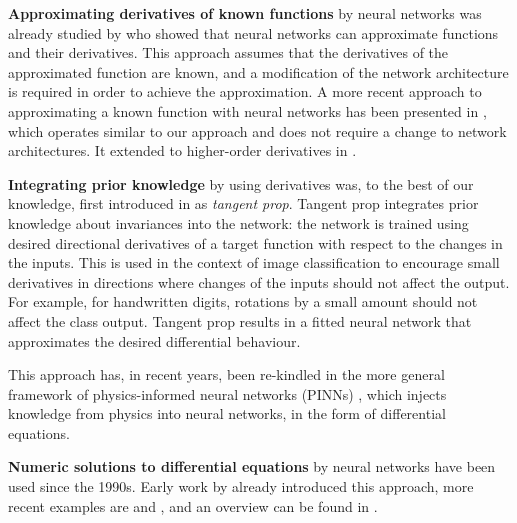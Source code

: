 \documentclass{article}
\newcommand{\kibitz}[2]{\ifnum\Comments=1\textcolor{#1}{#2}\fi}
\newcommand{\kizito}[1]{\kibitz{red} {[Kizito: #1]}}
\begin{document}
\textbf{Approximating derivatives of known functions} by neural networks 
was already studied by \cite{hornik-et-al-1990-universal} who showed that neural networks can approximate functions and their derivatives. 
This approach assumes that the derivatives of the approximated function are known, and a modification of the network architecture is required in order to achieve the approximation. 
A more recent approach to approximating a known function with neural networks has been presented in \cite{Avrutskiy2017}, which operates similar to our approach and does not require a change to network architectures. 
It extended to higher-order derivatives in 
\cite{Avrutskiy2021}. 

\textbf{Integrating prior knowledge} by using derivatives was, to the best of our knowledge, first introduced in
\cite{LeCun91} as \emph{tangent prop}. 
Tangent prop integrates prior knowledge about invariances into the network: the network is trained using desired directional derivatives of a target function with respect to the changes in the inputs. 
This is used in the context of image classification to encourage small derivatives in directions where changes of the inputs should not affect the output. 
For example, for handwritten digits, rotations by a small amount should not affect the class output. 
Tangent prop results in a fitted neural network that approximates the desired differential behaviour. 

This approach has, in recent years, been re-kindled in the more general framework of physics-informed neural networks (PINNs) \cite{raissi2019physics,cuomo2022scientific}, which injects knowledge from physics into neural networks, in the form of differential equations. 

\textbf{Numeric solutions to differential equations} by neural networks have been used since the 1990s. 
Early work by \cite{lee1990neural} already introduced this approach, more recent examples are \cite{parisi2003solving} and \cite{malek2006numerical}, and an overview can be found in \cite{beck2023overview}.
\end{document}
